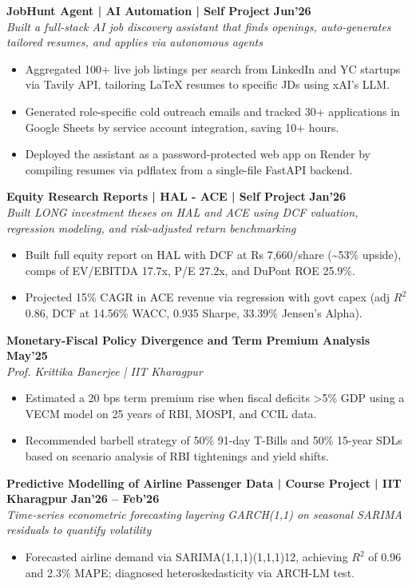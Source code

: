 \documentclass[10pt, a4paper]{article}
\newenvironment{achievelist}{
  \begin{itemize}[leftmargin=1.2em, itemsep=0.5pt, parsep=0pt, topsep=1pt]
    \small
}{
  \end{itemize}
  \vspace{-2pt}
}
\newcommand{\achieve}[1]{\item #1}
\begin{document}
\textbf{JobHunt Agent | AI Automation | Self Project} \hfill \textbf{\small Jun'26} \\
\textit{\small Built a full-stack AI job discovery assistant that finds openings, auto-generates tailored resumes, and applies via autonomous agents}
\begin{achievelist}
  \achieve{Aggregated 100+ live job listings per search from LinkedIn and YC startups via Tavily API, tailoring LaTeX resumes to specific JDs using xAI's LLM.}
  \achieve{Generated role-specific cold outreach emails and tracked 30+ applications in Google Sheets by service account integration, saving 10+ hours.}
  \achieve{Deployed the assistant as a password-protected web app on Render by compiling resumes via pdflatex from a single-file FastAPI backend.}
\end{achievelist}

\textbf{Equity Research Reports | HAL - ACE | Self Project} \hfill \textbf{\small Jan'26} \\
\textit{\small Built LONG investment theses on HAL and ACE using DCF valuation, regression modeling, and risk-adjusted return benchmarking}
\begin{achievelist}
  \achieve{Built full equity report on HAL with DCF at Rs 7,660/share (\textasciitilde 53\% upside), comps of EV/EBITDA 17.7x, P/E 27.2x, and DuPont ROE 25.9\%.}
  \achieve{Projected 15\% CAGR in ACE revenue via regression with govt capex (adj $R^2$ 0.86, DCF at 14.56\% WACC, 0.935 Sharpe, 33.39\% Jensen's Alpha).}
\end{achievelist}

\textbf{Monetary-Fiscal Policy Divergence and Term Premium Analysis} \hfill \textbf{\small May'25} \\
\textit{\small Prof. Krittika Banerjee | IIT Kharagpur}
\begin{achievelist}
  \achieve{Estimated a 20 bps term premium rise when fiscal deficits >5\% GDP using a VECM model on 25 years of RBI, MOSPI, and CCIL data.}
  \achieve{Recommended barbell strategy of 50\% 91-day T-Bills and 50\% 15-year SDLs based on scenario analysis of RBI tightenings and yield shifts.}
\end{achievelist}

\textbf{Predictive Modelling of Airline Passenger Data | Course Project | IIT Kharagpur} \hfill \textbf{\small Jan'26 -- Feb'26} \\
\textit{\small Time-series econometric forecasting layering GARCH(1,1) on seasonal SARIMA residuals to quantify volatility}
\begin{achievelist}
  \achieve{Forecasted airline demand via SARIMA(1,1,1)(1,1,1)12, achieving $R^2$ of 0.96 and 2.3\% MAPE; diagnosed heteroskedasticity via ARCH-LM test.}
\end{achievelist}
\end{document}
